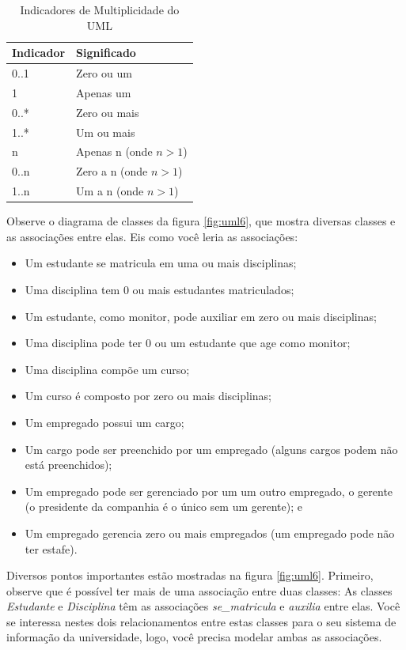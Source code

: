 \documentclass[
	article,			%
	12pt,				%
	openright,
	twoside,			%
	a4paper,			%
	english,			%
	french,
	brazil,				%
	sumario=tradicional
	]{abntex2}
\begin{document}
\begin{table}
\caption{Indicadores de Multiplicidade do UML} \label{tab:uml:mult}
\begin{center}
\begin{tabular}{l l}

\textbf{Indicador} & \textbf{Significado} \\
\hline

0..1 & Zero ou um \\
1 & Apenas um \\
0..* & Zero ou mais \\
1..* & Um ou mais \\
n & Apenas n (onde $n>1$) \\
0..n & Zero a n (onde $n>1$) \\
1..n & Um a n (onde $n>1$)\\
\hline

\end{tabular}
\end{center}
\end{table}

Observe o diagrama de classes da figura \ref{fig:uml6}, que mostra diversas classes e as associações entre elas. Eis como você leria as associações:
\begin{itemize}
\item Um estudante se matricula em uma ou mais disciplinas;
\item Uma disciplina tem 0 ou mais estudantes matriculados;
\item Um estudante, como monitor, pode auxiliar em zero ou mais disciplinas;
\item Uma disciplina pode ter 0 ou um estudante que age como monitor;
\item Uma disciplina compõe um curso;
\item Um curso é composto por zero ou mais disciplinas;
\item Um empregado possui um cargo;
\item Um cargo pode ser preenchido por um empregado (alguns cargos podem não está preenchidos);
\item Um empregado pode ser gerenciado por um um outro empregado, o gerente (o presidente da companhia é o único sem um gerente); e
\item Um empregado gerencia zero ou mais empregados (um empregado pode não ter estafe).
\end{itemize}

Diversos pontos importantes estão mostradas na figura \ref{fig:uml6}. Primeiro, observe que é possível ter mais de uma associação entre duas classes: As classes \emph{Estudante} e \emph{Disciplina} têm as associações \emph{se\_matricula} e \emph{auxilia} entre elas. Você se interessa nestes dois relacionamentos entre estas classes para o seu sistema de informação da universidade, logo, você precisa modelar ambas as associações.
\end{document}
